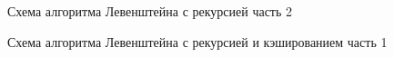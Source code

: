 \begin{figure}
	\caption{Схема алгоритма Левенштейна с рекурсией часть 2}
\end{figure}

\begin{figure}
	\caption{Схема алгоритма Левенштейна с рекурсией и кэшированием часть 1}
\end{figure}

